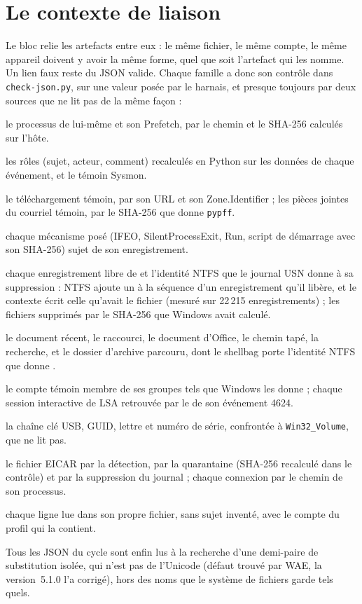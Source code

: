\documentclass[11pt,a4paper,oneside]{report}
\begin{document}
\section{Le contexte de liaison}

Le bloc  relie les artefacts entre eux : le même fichier, le même
compte, le même appareil doivent y avoir la même forme, quel que soit
l'artefact qui les nomme. Un lien faux reste du JSON valide. Chaque famille a
donc son contrôle dans \texttt{check-json.py}, sur une valeur posée par le
harnais, et presque toujours par deux sources que \wac{} ne lit pas de la même
façon :
\begin{description}[style=nextline,leftmargin=1.2em]
  \item[Exécutions] le processus de \wac{} lui-même et son Prefetch, par le
    chemin et le SHA-256 calculés sur l'hôte.
  \item[Événements] les rôles (sujet, acteur, comment) recalculés en Python
    sur les données de chaque événement, et le témoin Sysmon.
  \item[Arrivées] le téléchargement témoin, par son URL et son
    Zone.Identifier ; les pièces jointes du courriel témoin, par le SHA-256
    que donne \texttt{pypff}.
  \item[Persistance] chaque mécanisme posé (IFEO, SilentProcessExit, Run,
    script de démarrage avec son SHA-256) sujet de son enregistrement.
  \item[Système de fichiers] chaque enregistrement libre de
     et l'identité NTFS que le journal USN donne à sa
    suppression : NTFS ajoute un à la séquence d'un enregistrement qu'il
    libère, et le contexte écrit celle qu'avait le fichier (mesuré sur
    22\,215 enregistrements) ; les fichiers supprimés par le SHA-256 que
    Windows avait calculé.
  \item[Accès] le document récent, le raccourci, le document d'Office, le
    chemin tapé, la recherche, et le dossier d'archive parcouru, dont le
    shellbag porte l'identité NTFS que donne .
  \item[Comptes et sessions] le compte témoin membre de ses groupes tels que
    Windows les donne ; chaque session interactive de LSA retrouvée par le
     de son événement 4624.
  \item[Appareils et volumes] la chaîne clé USB, GUID, lettre et numéro de
    série, confrontée à \texttt{Win32\_Volume}, que \wac{} ne lit pas.
  \item[Réseau et défense] le fichier EICAR par la détection, par la
    quarantaine (SHA-256 recalculé dans le contrôle) et par la suppression
    du journal ; chaque connexion par le chemin de son processus.
  \item[Traces d'applications] chaque ligne lue dans son propre fichier, sans
    sujet inventé, avec le compte du profil qui la contient.
\end{description}
Tous les JSON du cycle sont enfin lus à la recherche d'une demi-paire de
substitution isolée, qui n'est pas de l'Unicode (défaut trouvé par WAE, la
version~5.1.0 l'a corrigé), hors des noms que le système de fichiers garde
tels quels.
\end{document}
